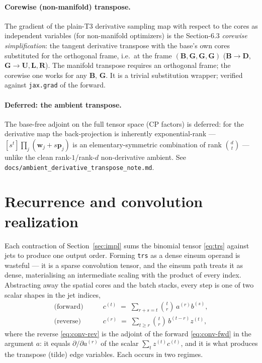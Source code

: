 \documentclass[11pt]{article}
\theoremstyle{definition}
\theoremstyle{plain}
\begin{document}
\paragraph{Corewise (non-manifold) transpose.}
The gradient of the plain-T3 derivative sampling map with respect to the cores as independent variables
(for non-manifold optimizers) is the Section-6.3 \emph{corewise simplification}: the tangent derivative
transpose with the base's own cores substituted for the orthogonal frame, i.e.\ at the frame
$(\mathbf B,\mathbf G,\mathbf G,\mathbf G)$ ($\mathbf B\to\mathbf D$, $\mathbf G\to\mathbf U,\mathbf L,\mathbf R$).
The manifold transpose requires an orthogonal frame; the corewise one works for any $\mathbf B$, $\mathbf G$.
It is a trivial substitution wrapper; verified against \texttt{jax.grad} of the forward.

\paragraph{Deferred: the ambient transpose.}
The base-free adjoint on the full tensor space (CP factors) is deferred: for the derivative map the
back-projection is inherently exponential-rank --- $[s^t]\!\prod_j(\mathbf w_j+s\mathbf p_j)$ is an
elementary-symmetric combination of rank $\binom{d}{t}$ --- unlike the clean rank-$1$/rank-$d$
non-derivative ambient. See \texttt{docs/ambient\_derivative\_transpose\_note.md}.

\section{Recurrence and convolution realization}
\label{sec:recurrence}

Each contraction of Section~\ref{sec:impl} sums the binomial tensor \eqref{eq:trs} against jets to
produce one output order. Forming \texttt{trs} as a dense einsum operand is wasteful --- it is a sparse
convolution tensor, and the einsum path treats it as dense, materialising an intermediate scaling with
the product of every index. Abstracting away the spatial cores and the batch stacks, every step is one
of two scalar shapes in the jet indices,
\begin{align}
  \text{(forward)} \qquad & c^{(t)} \;=\; \sum_{r+s=t} \binom{t}{r}\, a^{(r)} b^{(s)},
  \label{eq:conv-fwd}\\
  \text{(reverse)} \qquad & c^{(r)} \;=\; \sum_{t \ge r} \binom{t}{r}\, b^{(t-r)} z^{(t)},
  \label{eq:conv-rev}
\end{align}
where the reverse \eqref{eq:conv-rev} is the adjoint of the forward \eqref{eq:conv-fwd} in the argument
$a$: it equals $\partial/\partial a^{(r)}$ of the scalar $\sum_t z^{(t)} c^{(t)}$, and it is what
produces the transpose (tilde) edge variables. Each occurs in two regimes.
\end{document}
